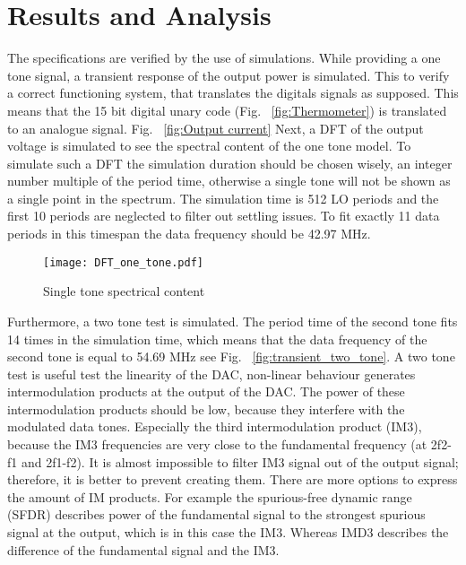 \section{Results and Analysis}\label{sec:simulations}
The specifications are verified by the use of simulations. While providing a one tone signal, a transient response of the output power is simulated. This to verify a correct functioning system, that translates the digitals signals as supposed. This means that the 15 bit digital unary code (Fig. ~\ref{fig:Thermometer}) is translated to an analogue signal. Fig. ~\ref{fig:Output current}
Next, a DFT of the output voltage is simulated to see the spectral content of the one tone model. To simulate such a DFT the simulation duration should be chosen wisely, an integer number multiple of the period time, otherwise a single tone will not be shown as a single point in the spectrum. The simulation time is 512 LO periods and the first 10 periods are neglected to filter out settling issues. To fit exactly 11 data periods in this timespan the data frequency should be 42.97 MHz.
\begin{figure}[htp] 
\texttt{[image: DFT\_one\_tone.pdf]}
\caption{Single tone spectrical content}
\label{fig:transient_single_tone}
\end{figure}
Furthermore, a two tone test is simulated. The period time of the second tone fits 14 times in the simulation time, which means that the data frequency of the second tone is equal to 54.69 MHz see Fig. ~\ref{fig:transient_two_tone}. A two tone test is useful test the linearity of the DAC, non-linear behaviour generates intermodulation products at the output of the DAC. The power of these intermodulation products should be low, because they interfere with the modulated data tones. Especially the third intermodulation product (IM3), because the IM3 frequencies are very close to the fundamental frequency (at 2f2-f1 and 2f1-f2). It is almost impossible to filter IM3 signal out of the output signal; therefore, it is better to prevent creating them. There are more options to express the amount of IM products. For example the spurious-free dynamic range (SFDR) describes power of the fundamental signal to the strongest spurious signal at the output, which is in this case the IM3. Whereas IMD3 describes the difference of the fundamental signal and the IM3.
